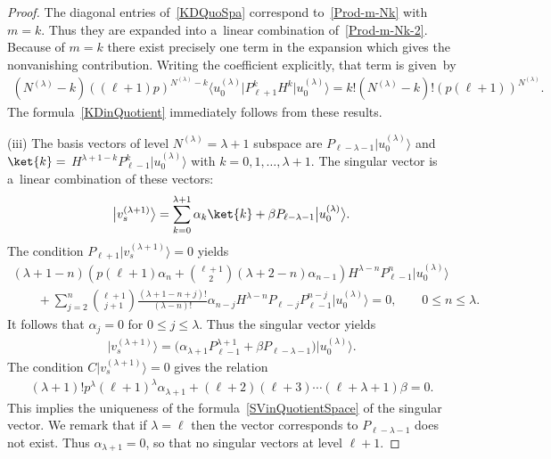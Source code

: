 \documentclass[pdftex]{sigma}
\numberwithin{equation}{section}
\begin{document}
\begin{proof}
The diagonal entries of~\eqref{KDQuoSpa} correspond to~\eqref{Prod-m-Nk} with $ m = k$.
Thus they are expanded into a~linear combination of~\eqref{Prod-m-Nk-2}.
Because of $ m = k $ there exist precisely one term in the expansion which gives the nonvanishing contribution.
Writing the coef\/f\/icient explicitly, that term is given~by
\begin{gather*}
(N^{(\lambda)}-k) ((\ell+1) p)^{N^{(\lambda)}-k} \big\langle u_0^{(\lambda)}\big| P_{\ell+1}^k H^k \big|u_0^{(\lambda)}\big\rangle  = k!
(N^{(\lambda)}-k)!   (p  (\ell+1))^{N^{(\lambda)}}.
\end{gather*}
The formula~\eqref{KDinQuotient} immediately follows from these results.

 (iii) The basis vectors of level $ N^{(\lambda)} = \lambda + 1 $ subspace are $ P_{\ell-\lambda-1}
\big|u_0^{(\lambda)}\big\rangle  $ and $ \ket{k} =$ \linebreak  $H^{\lambda+1-k}   P_{\ell-1}^k \big|u_0^{(\lambda)}\big\rangle$ with $
k=0,1,\dots,\lambda+1$.
The singular vector is a~linear combination of these vectors:
\begin{gather*}
\big|v_s^{(\lambda+1)}\big\rangle  = \sum\limits_{k=0}^{\lambda+1} \alpha_k \ket{k} + \beta P_{\ell-\lambda-1}
\big|u_0^{(\lambda)}\big\rangle .
\end{gather*}
The condition $ P_{\ell+1} \big|v_s^{(\lambda+1)}\big\rangle  = 0 $ yields
\begin{gather*}
    (\lambda+1-n) \left(  p (\ell+1)  \alpha_n + \binom{\ell+1}{2} (\lambda+2-n) \alpha_{n-1} \right) H^{\lambda-n}
P_{\ell-1}^n \big|u_0^{(\lambda)}\big\rangle
\\
\qquad{}
+ \sum\limits_{j=2}^n \binom{\ell+1}{j+1} \frac{(\lambda+1-n+j)!}{(\lambda-n)!}   \alpha_{n-j} H^{\lambda-n} P_{\ell-j}
P_{\ell-1}^{n-j} \big|u_0^{(\lambda)}\big\rangle  = 0,
\qquad
0 \leq n \leq \lambda.
\end{gather*}
It follows that $ \alpha_j = 0 $ for $ 0 \leq j \leq \lambda$.
Thus the singular vector yields
\begin{gather*}
\big|v_s^{(\lambda+1)}\big\rangle  = \big(  \alpha_{\lambda+1} P_{\ell-1}^{\lambda+1} + \beta P_{\ell-\lambda-1}  \big)
\big|u_0^{(\lambda)}\big\rangle .
\end{gather*}
The condition $ C \big|v_s^{(\lambda+1)}\big\rangle  = 0 $ gives the relation
\begin{gather*}
(\lambda+1)!  p^{\lambda} (\ell+1)^{\lambda} \alpha_{\lambda+1} + (\ell+2) (\ell+3) \cdots (\ell+\lambda+1) \beta = 0.
\end{gather*}
This implies the uniqueness of the formula~\eqref{SVinQuotientSpace} of the singular vector.
We remark that if $ \lambda=\ell $ then the vector corresponds to $ P_{\ell-\lambda-1} $ does not exist.
Thus $ \alpha_{\lambda+1} = 0 $, so that no singular vectors at level $ \ell+1$.
\end{proof}
\end{document}
